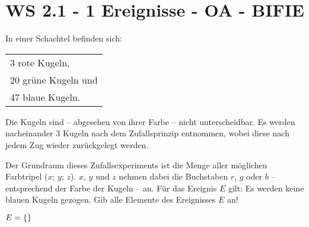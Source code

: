\section{WS 2.1 - 1 Ereignisse - OA - BIFIE}


\begin{beispiel}[WS 2.1]{1} %
In einer Schachtel befinden sich:

\hspace{4cm}\begin{tabular}{l}
3 rote Kugeln, \\
20 grüne Kugeln und \\
47 blaue Kugeln. \\
\end{tabular}

Die Kugeln sind -- abgesehen von ihrer Farbe -- nicht unterscheidbar.
Es werden nacheinander 3 Kugeln nach dem Zufallsprinzip entnommen, wobei diese nach
jedem Zug wieder zurückgelegt werden. 

\leer

Der Grundraum dieses Zufallsexperiments ist die Menge aller möglichen Farbtripel ($x$; $y$; $z$).
$x$, $y$ und $z$ nehmen dabei die Buchstaben $r$, $g$ oder $b$ -- entsprechend der Farbe der Kugeln -- an. Für das Ereignis $E$ gilt: Es werden keine blauen Kugeln gezogen.
Gib alle Elemente des Ereignisses $E$ an! 


\leer

$E=\{\hrulefill\}$


\end{beispiel}